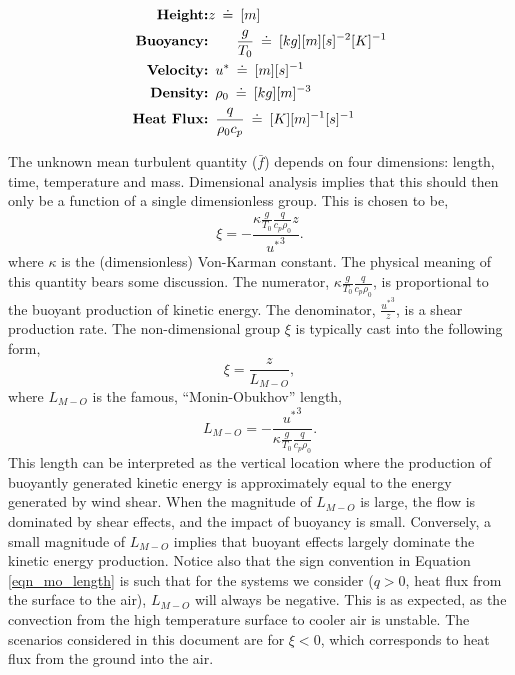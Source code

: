 \begin{eqnarray}
 \textbf{Height:}& z\enskip \dot = \enskip [m]  \\
 \textbf{Buoyancy:}& \qquad \frac{g}{T_0}\enskip \dot = \enskip [kg] [m] [s]^{-2}
  [K]^{-1} \\ 
 \textbf{Velocity:}& \enskip u^* \enskip \dot = \enskip [m] [s]^{-1} \\
  \textbf{Density:}&  \enskip \rho_0 \enskip \dot = \enskip [kg] [m]^{-3}  \\
 \textbf{Heat Flux:}& \enskip \frac{q}{\rho_0 c_p} \enskip \dot = \enskip [K] [m]^{-1} [s]^{-1} \\
\end{eqnarray}

The unknown mean turbulent quantity ($\bar f$) depends on four
dimensions: length, time, temperature and mass. Dimensional analysis
implies that this should then only be a function of a single dimensionless
group\cite{munson2012fundamentals}. This is chosen to be,
\begin{equation}
 \xi = -\frac{\kappa \frac{g}{T_0} \frac{q}{c_p \rho_0} z}{ {u^*}^3}.
\end{equation}
where $\kappa$ is the (dimensionless) Von-Karman constant. 
The physical meaning of this quantity bears some discussion.  
The numerator, $\kappa \frac{g}{T_0} \frac{q}{c_p \rho_0} $, is
proportional to the buoyant production of kinetic energy.  The
denominator, $\frac{{u^*}^3}{z}$, is a shear production rate. 
%
The non-dimensional group $\xi$ is typically cast into the following 
form, 
\begin{equation}
 \xi = \frac{z}{L_{M-O}},
\end{equation}
where $L_{M-O}$ is the famous, ``Monin-Obukhov'' length,
\begin{equation}
 L_{M-O} = -\frac{{u^*}^3}{\kappa \frac{g}{T_0} \frac{q}{c_p \rho_0}}. 
  \label{eqn_mo_length}
\end{equation}
%
This length can be interpreted as the vertical location
where the production of buoyantly generated kinetic energy is
approximately equal to the energy generated by wind shear. When the
magnitude of $L_{M-O}$ is large, the flow is dominated by shear effects,
and the impact of buoyancy is small. Conversely, a small magnitude of
$L_{M-O}$ implies that buoyant effects largely dominate the kinetic
energy production. Notice also that the sign convention in Equation
\ref{eqn_mo_length} is such that for the systems we consider ($q > 0$, heat
flux from the surface to the air), $L_{M-O}$ will always be
negative. This is as expected, as the convection from the high
temperature surface to cooler air is unstable. 
The scenarios considered in this document are for $\xi<0$, which
corresponds to heat flux from the ground into the air. 

